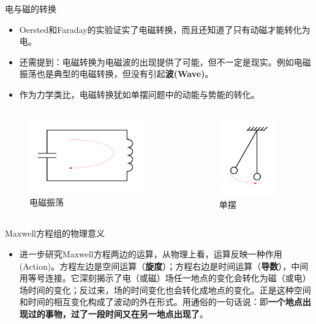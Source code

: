 \begin{frame}{电与磁的转换}
  \begin{itemize}
    \item Oersted和Faraday的实验证实了电磁转换，而且还知道了只有动磁才能转化为电。
    \item 还需提到：电磁转换为电磁波的出现提供了可能，但不一定是现实。例如电磁振荡也是典型的电磁转换，但没有引起\textbf{波(Wave)}。
    \item 作为力学类比，电磁转换犹如单摆问题中的动能与势能的转化。
  \end{itemize}
  \begin{columns}
    \begin{column}{0.45\linewidth}
      \begin{figure}
        \includegraphics[width=5cm]{Cha1//fig1-1.pdf}
        \caption{电磁振荡}
      \end{figure}
    \end{column}
    \begin{column}{0.45\linewidth}
      \begin{figure}
        \includegraphics[width=2.5cm]{Cha1//fig1-2.pdf}
        \caption{单摆}
      \end{figure}
    \end{column}
  \end{columns}
\end{frame}

\begin{frame}{Maxwell方程组的物理意义}
  \begin{itemize}
    \item 进一步研究Maxwell方程两边的运算，从物理上看，运算反映一种作用(Action)。方程左边是空间运算（\textbf{旋度}）；方程右边是时间运算（\textbf{导数}），中间用等号连接。它深刻揭示了电（或磁）场任一地点的变化会转化为磁（或电）场时间的变化；反过来，场的时间变化也会转化成地点的变化。正是这种空间和时间的相互变化构成了波动的外在形式。用通俗的一句话说：即\textbf{一个地点出现过的事物，过了一段时间又在另一地点出现了}。
  \end{itemize}
\end{frame}

